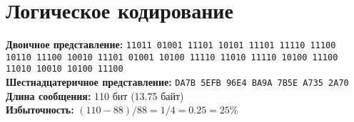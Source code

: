 \section{Логическое кодирование}
\textbf{Двоичное представление:} \texttt{11011 01001 11101 10101 11101 11110 11100 10110 11100 10010 11101 01001 10100 11110 11010 11110 10100 11100 11010 10010 10100 11100}\\
\textbf{Шестнадцатеричное представление:} \texttt{DA7B 5EFB 96E4 BA9A 7B5E A735 2A70}\\
\textbf{Длина сообщения:} 110 бит (13.75 байт)\\
\textbf{Избыточность:} $(110 - 88) / 88 = 1/4 = 0.25 = 25\%$
